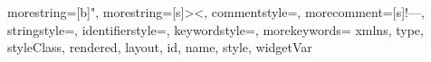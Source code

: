 \usepackage{listings}

\usepackage{color}


{
  morestring=[b]",
  morestring=[s]{>}{<},
  commentstyle=\color{orange},
  morecomment=[s]{!--}{--},
  stringstyle=\color{black},
  identifierstyle=\color{darkblue},
  keywordstyle=\color{mauve},
  morekeywords={
  	xmlns,
  	type,
  	styleClass,
  	rendered,
  	layout,
  	id,
  	name,
  	style,
  	widgetVar}%
}